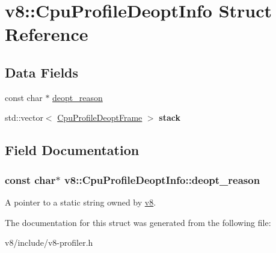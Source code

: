 \hypertarget{structv8_1_1CpuProfileDeoptInfo}{}\section{v8\+:\+:Cpu\+Profile\+Deopt\+Info Struct Reference}
\label{structv8_1_1CpuProfileDeoptInfo}
\subsection*{Data Fields}
\begin{DoxyCompactItemize}
\item 
const char $\ast$ \hyperlink{structv8_1_1CpuProfileDeoptInfo_a908eb3ba33b47ace8973eeb2fda96ca9}{deopt\+\_\+reason}
\item 
\hypertarget{structv8_1_1CpuProfileDeoptInfo_a9446493c0e0a00e3ada02ba8df858d42}{}std\+::vector$<$ \hyperlink{structv8_1_1CpuProfileDeoptFrame}{Cpu\+Profile\+Deopt\+Frame} $>$ {\bfseries stack}\label{structv8_1_1CpuProfileDeoptInfo_a9446493c0e0a00e3ada02ba8df858d42}

\end{DoxyCompactItemize}


\subsection{Field Documentation}
\hypertarget{structv8_1_1CpuProfileDeoptInfo_a908eb3ba33b47ace8973eeb2fda96ca9}{}
\subsubsection[{deopt\+\_\+reason}]{\setlength{\rightskip}{0pt plus 5cm}const char$\ast$ v8\+::\+Cpu\+Profile\+Deopt\+Info\+::deopt\+\_\+reason}\label{structv8_1_1CpuProfileDeoptInfo_a908eb3ba33b47ace8973eeb2fda96ca9}
A pointer to a static string owned by \hyperlink{namespacev8}{v8}. 

The documentation for this struct was generated from the following file\+:\begin{DoxyCompactItemize}
\item 
v8/include/v8-\/profiler.\+h\end{DoxyCompactItemize}
